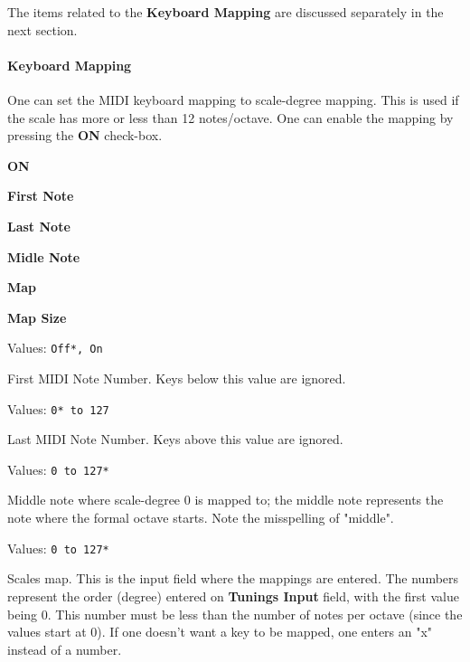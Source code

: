 
   The items related to the \textbf{Keyboard Mapping} are discussed
   separately in the next section.

\paragraph{Keyboard Mapping}
\label{paragraph:menu_scales_keyboard_mapping}

   One can set the MIDI keyboard mapping to scale-degree mapping.
   This is used if the scale has more or less than 12 notes/octave.
   One can enable the mapping by pressing the \textbf{ON} check-box.

   \begin{enumber}
      \item \textbf{ON}
      \item \textbf{First Note}
      \item \textbf{Last Note}
      \item \textbf{Midle Note}
      \item \textbf{Map}
      \item \textbf{Map Size}
   \end{enumber}

   \setcounter{ItemCounter}{0}      %


   Values: \texttt{Off*, On}

   First MIDI Note Number.
   Keys below this value are ignored.

   Values: \texttt{0* to 127}

   Last MIDI Note Number.
   Keys above this value are ignored.

   Values: \texttt{0 to 127*}

   Middle note where scale-degree 0 is mapped to;
   the middle note represents the note where the formal octave starts.
   Note the misspelling of "middle".

   Values: \texttt{0 to 127*}

   Scales map.  This is the input field where the mappings are entered.
   The numbers represent the order (degree) entered on
   \textbf{Tunings Input} field, with the first value being 0.
   This number must be less than the number of notes per octave (since
   the values start at 0).
   If one doesn't want a key to be mapped, one enters an "x" instead of a
   number.

